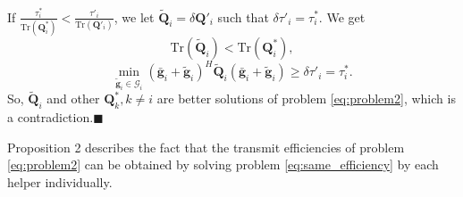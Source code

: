 \documentclass[journal]{IEEEtran}
\begin{document}
If $\frac{\tau_i^*}{\text{Tr}(\mathbf{Q}_i^*)} < \frac{\tau'_i}{\text{Tr}(\mathbf{Q}'_i)}$, we let $\tilde{\mathbf{Q}}_i = \delta\mathbf{Q}'_i$ such that $\delta\tau'_i = \tau_i^*$. We get
\begin{equation}
\text{Tr}(\tilde{\mathbf{Q}}_i) < \text{Tr}(\mathbf{Q}^*_i),\nonumber
\end{equation} 
\begin{equation}
\min_{\tilde{\mathbf{g}}_i \in \mathcal{G}_i}(\bar{\mathbf{g}}_i+\tilde{\mathbf{g}}_i)^H\tilde{\mathbf{Q}}_i(\bar{\mathbf{g}}_i+\tilde{\mathbf{g}}_i) \geq \delta\tau'_i = \tau_i^*. \nonumber
\end{equation}
So,  $\tilde{\mathbf{Q}}_i$ and other $\mathbf{Q}_k^*, k \neq i$ are better solutions of problem \eqref{eq:problem2}, which is a contradiction.\hfill$\blacksquare$

Proposition 2 describes the fact that the transmit efficiencies of problem \eqref{eq:problem2} can be obtained by solving problem \eqref{eq:same_efficiency} by each helper individually.



\end{document}
